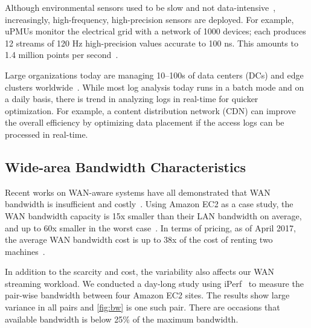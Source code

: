  Although environmental sensors used to be
slow and not data-intensive~\cite{atzori2010internet}, increasingly,
high-frequency, high-precision sensors are deployed. For example, uPMUs monitor
the electrical grid with a network of 1000 devices; each produces 12 streams of
120 Hz high-precision values accurate to 100 ns. This amounts to 1.4 million
points per second~\cite{andersen2016btrdb}.

 Large organizations today are managing 10--100s of
data centers (DCs) and edge clusters worldwide~\cite{calder2013mapping}. While
most log analysis today runs in a batch mode and on a daily basis, there is
trend in analyzing logs in real-time for quicker optimization. For example, a
content distribution network (CDN) can improve the overall efficiency by
optimizing data placement if the access logs can be processed in real-time.


\subsection{Wide-area Bandwidth Characteristics}
\label{sec:wide-area-bandwidth}

Recent works on WAN-aware systems have all demonstrated that WAN bandwidth is
insufficient and costly~\cite{pu2015low, vulimiri2015global,
  vulimiri2015wananlytics, hsieh17gaia}. Using Amazon EC2 as a case study, the
WAN bandwidth capacity is 15x smaller than their LAN bandwidth on average, and
up to 60x smaller in the worst case~\cite{hsieh17gaia}. In terms of pricing, as
of April 2017, the average WAN bandwidth cost is up to 38x of the cost of
renting two machines~\cite{amazon2017pricing}.

In addition to the scarcity and cost, the variability also affects our WAN
streaming workload. We conducted a day-long study using iPerf~\cite{iperf3} to
measure the pair-wise bandwidth between four Amazon EC2 sites. The results show
large variance in all pairs and \autoref{fig:bw} is one such pair. There are
occasions that available bandwidth is below 25\% of the maximum bandwidth.

